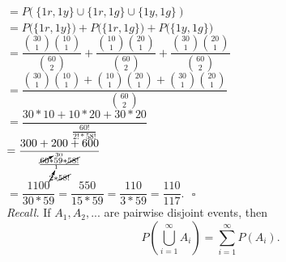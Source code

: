 \documentclass[12pt]{book}
\begin{document}
$= P\big(   ~\{1r,1y\} \cup \{1r,1g\} \cup \{1y,1g\}~   \big)$\\

$=P\big(  \{1r,1y\}  \big) + P\big(  \{1r,1g\}  \big) + P\big(  \{1y,1g\}  \big)$\\

$=\dfrac{{30\choose1}{10\choose1}}{{60\choose2}} + \dfrac{{10\choose1}{20\choose1}}{{60\choose2}} + \dfrac{{30\choose1}{20\choose1}}{{60\choose2}}$\\

$=\dfrac{{30\choose1}{10\choose1}+{10\choose1}{20\choose1}+{30\choose1}{20\choose1}}{{60\choose2}}$\\

$=\dfrac{30*10+10*20+30*20}{\frac{60!}{2!*58!}}$\\

$= \dfrac{300+200+600}{    \frac   {\cancelto{30}{60} *59*\cancel{58!}}  {\cancelto{1}{2} *\cancel{58!}    }      }$ \\

$= \dfrac{1100}{30*59} = \dfrac{550}{15*59} = \dfrac{110}{3*59}=\dfrac{110}{117}.~~~\square$\\

\noindent \textit{Recall. } If $A_{1},A_{2}, ...$ are pairwise disjoint events, then $$P\left(\bigcup\limits_{i=1}^{\infty}A_{i}\right) = \sum\limits_{i=1}^{\infty}P(A_{i}).$$
\end{document}
